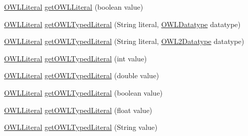 \begin{DoxyCompactItemize}
\hyperlink{interfaceorg_1_1semanticweb_1_1owlapi_1_1model_1_1_o_w_l_literal}{O\-W\-L\-Literal} \hyperlink{classuk_1_1ac_1_1manchester_1_1cs_1_1owl_1_1owlapi_1_1_o_w_l_data_factory_impl_a022ab29aa8e5aa514c9aa57b6e816061}{get\-O\-W\-L\-Literal} (boolean value)
\item 
\hyperlink{interfaceorg_1_1semanticweb_1_1owlapi_1_1model_1_1_o_w_l_literal}{O\-W\-L\-Literal} \hyperlink{classuk_1_1ac_1_1manchester_1_1cs_1_1owl_1_1owlapi_1_1_o_w_l_data_factory_impl_acd8a6cac47c33e3be1682810af998eb5}{get\-O\-W\-L\-Typed\-Literal} (String literal, \hyperlink{interfaceorg_1_1semanticweb_1_1owlapi_1_1model_1_1_o_w_l_datatype}{O\-W\-L\-Datatype} datatype)
\item 
\hyperlink{interfaceorg_1_1semanticweb_1_1owlapi_1_1model_1_1_o_w_l_literal}{O\-W\-L\-Literal} \hyperlink{classuk_1_1ac_1_1manchester_1_1cs_1_1owl_1_1owlapi_1_1_o_w_l_data_factory_impl_acfabe6bb9d5347253aa0e926032911e5}{get\-O\-W\-L\-Typed\-Literal} (String literal, \hyperlink{enumorg_1_1semanticweb_1_1owlapi_1_1vocab_1_1_o_w_l2_datatype}{O\-W\-L2\-Datatype} datatype)
\item 
\hyperlink{interfaceorg_1_1semanticweb_1_1owlapi_1_1model_1_1_o_w_l_literal}{O\-W\-L\-Literal} \hyperlink{classuk_1_1ac_1_1manchester_1_1cs_1_1owl_1_1owlapi_1_1_o_w_l_data_factory_impl_a614a511d549bc0bb240cd66a3b00c70e}{get\-O\-W\-L\-Typed\-Literal} (int value)
\item 
\hyperlink{interfaceorg_1_1semanticweb_1_1owlapi_1_1model_1_1_o_w_l_literal}{O\-W\-L\-Literal} \hyperlink{classuk_1_1ac_1_1manchester_1_1cs_1_1owl_1_1owlapi_1_1_o_w_l_data_factory_impl_a98ecb49ce56cc925e8b23cb1aafe9248}{get\-O\-W\-L\-Typed\-Literal} (double value)
\item 
\hyperlink{interfaceorg_1_1semanticweb_1_1owlapi_1_1model_1_1_o_w_l_literal}{O\-W\-L\-Literal} \hyperlink{classuk_1_1ac_1_1manchester_1_1cs_1_1owl_1_1owlapi_1_1_o_w_l_data_factory_impl_a11045f7cc2f47c5acc3411dc2ae730be}{get\-O\-W\-L\-Typed\-Literal} (boolean value)
\item 
\hyperlink{interfaceorg_1_1semanticweb_1_1owlapi_1_1model_1_1_o_w_l_literal}{O\-W\-L\-Literal} \hyperlink{classuk_1_1ac_1_1manchester_1_1cs_1_1owl_1_1owlapi_1_1_o_w_l_data_factory_impl_ab6a13efbbc7d77368ac222605c8c59e9}{get\-O\-W\-L\-Typed\-Literal} (float value)
\item 
\hyperlink{interfaceorg_1_1semanticweb_1_1owlapi_1_1model_1_1_o_w_l_literal}{O\-W\-L\-Literal} \hyperlink{classuk_1_1ac_1_1manchester_1_1cs_1_1owl_1_1owlapi_1_1_o_w_l_data_factory_impl_a4066ff4c3e91c0271c71238075ecdb48}{get\-O\-W\-L\-Typed\-Literal} (String value)

\end{DoxyCompactItemize}
